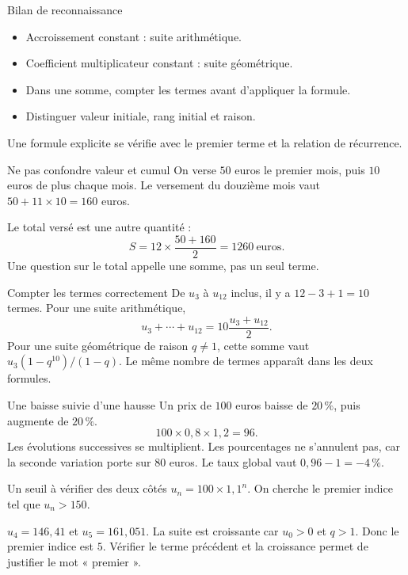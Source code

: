 \documentclass[aspectratio=169,12pt]{beamer}
\begin{document}
\renewcommand{\slidekind}{À RETENIR}
\begin{frame}[t,fragile]{Bilan de reconnaissance}
\begin{itemize}\item Accroissement constant : suite arithmétique.\item Coefficient multiplicateur constant : suite géométrique.\item Dans une somme, compter les termes avant d’appliquer la formule.\item Distinguer valeur initiale, rang initial et raison.\end{itemize} Une formule explicite se vérifie avec le premier terme et la relation de récurrence.
\end{frame}
\renewcommand{\slidekind}{COMPRENDRE}
\begin{frame}[t,fragile]{Ne pas confondre valeur et cumul}
On verse $50$ euros le premier mois, puis $10$ euros de plus chaque mois. Le versement du douzième mois vaut $50+11\times10=160$ euros.\medskip\par Le total versé est une autre quantité :\[S=12\times\frac{50+160}{2}=1260\ \text{euros}.\] Une question sur le total appelle une somme, pas un seul terme.
\end{frame}
\renewcommand{\slidekind}{COMPRENDRE}
\begin{frame}[t,fragile]{Compter les termes correctement}
De $u_3$ à $u_{12}$ inclus, il y a $12-3+1=10$ termes. Pour une suite arithmétique,\[u_3+\cdots+u_{12}=10\frac{u_3+u_{12}}2.\] Pour une suite géométrique de raison $q\ne1$, cette somme vaut $u_3(1-q^{10})/(1-q)$. Le même nombre de termes apparaît dans les deux formules.
\end{frame}
\renewcommand{\slidekind}{COMPRENDRE}
\begin{frame}[t,fragile]{Une baisse suivie d’une hausse}
Un prix de $100$ euros baisse de $20\,\%$, puis augmente de $20\,\%$.\[100\times0,8\times1,2=96.\] Les évolutions successives se multiplient. Les pourcentages ne s’annulent pas, car la seconde variation porte sur $80$ euros. Le taux global vaut $0,96-1=-4\,\%$.
\end{frame}
\renewcommand{\slidekind}{À RETENIR}
\begin{frame}[t,fragile]{Un seuil à vérifier des deux côtés}
$u_n=100\times1,1^n$. On cherche le premier indice tel que $u_n>150$.\medskip\par $u_4=146,41$ et $u_5=161,051$. La suite est croissante car $u_0>0$ et $q>1$. Donc le premier indice est $5$. Vérifier le terme précédent et la croissance permet de justifier le mot « premier ».
\end{frame}
\end{document}
